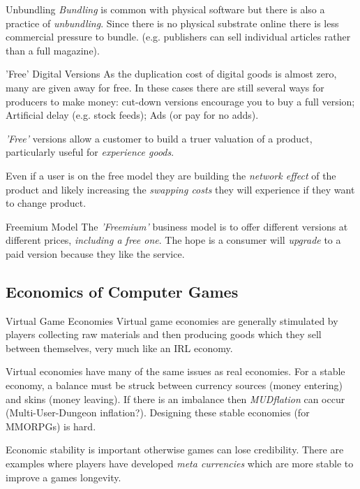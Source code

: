\documentclass[11pt,a4paper]{article}
\begin{document}
  \begin{remark}{Unbundling}
    \textit{Bundling} is common with physical software but there is also a practice of \textit{unbundling}. Since there is no physical substrate online there is less commercial pressure to bundle. (e.g. publishers can sell individual articles rather than a full magazine).
  \end{remark}

  \begin{remark}{'Free' Digital Versions}
    As the duplication cost of digital goods is almost zero, many are given away for free. In these cases there are still several ways for producers to make money: cut-down versions encourage you to buy a full version; Artificial delay (e.g. stock feeds); Ads (or pay for no adds).
    \par \textit{'Free'} versions allow a customer to build a truer valuation of a product, particularly useful for \textit{experience goods}.
    \par Even if a user is on the free model they are building the \textit{network effect} of the product and likely increasing the \textit{swapping costs} they will experience if they want to change product.
  \end{remark}

  \begin{proposition}{Freemium Model}
    The \textit{'Freemium'} business model is to offer different versions at different prices, \textit{including a free one}. The hope is a consumer will \textit{upgrade} to a paid version because they like the service.
  \end{proposition}

\subsection{Economics of Computer Games}

  \begin{proposition}{Virtual Game Economies}
    Virtual game economies are generally stimulated by players collecting raw materials and then producing goods which they sell between themselves, very much like an IRL economy.
    \par Virtual economies have many of the same issues as real economies. For a stable economy, a balance must be struck between currency sources (money entering) and skins (money leaving). If there is an imbalance then \textit{MUDflation} can occur (Multi-User-Dungeon inflation?). Designing these stable economies (for MMORPGs) is hard.
    \par Economic stability is important otherwise games can lose credibility. There are examples where players have developed \textit{meta currencies} which are more stable to improve a games longevity.
  \end{proposition}
\end{document}
